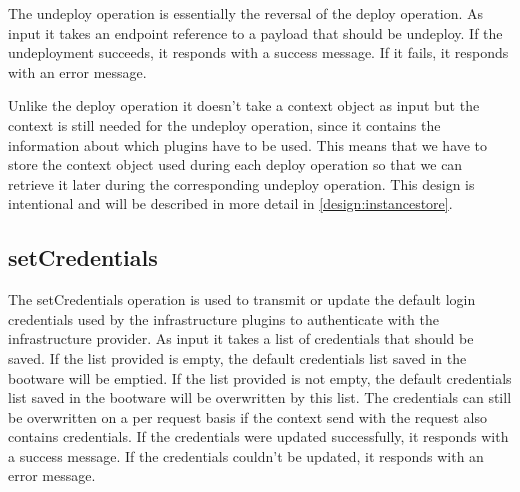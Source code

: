 The undeploy operation is essentially the reversal of the deploy operation.
As input it takes an endpoint reference to a payload that should be undeploy.
If the undeployment succeeds, it responds with a success message.
If it fails, it responds with an error message.

Unlike the deploy operation it doesn't take a context object as input but the context is still needed for the undeploy operation, since it contains the information about which plugins have to be used.
This means that we have to store the context object used during each deploy operation so that we can retrieve it later during the corresponding undeploy operation.
This design is intentional and will be described in more detail in \autoref{design:instancestore}.

\subsection{setCredentials}

The setCredentials operation is used to transmit or update the default login credentials used by the infrastructure plugins to authenticate with the infrastructure provider.
As input it takes a list of credentials that should be saved.
If the list provided is empty, the default credentials list saved in the bootware will be emptied.
If the list provided is not empty, the default credentials list saved in the bootware will be overwritten by this list.
The credentials can still be overwritten on a per request basis if the context send with the request also contains credentials.
If the credentials were updated successfully, it responds with a success message.
If the credentials couldn't be updated, it responds with an error message.
